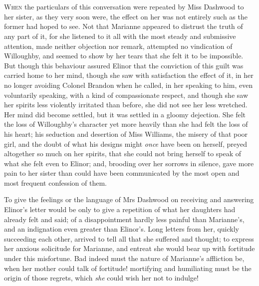 \chapter[Chapter \thechapter]{}
\lettrine[lraise=0.3]{W}{hen} the particulars of this conversation were repeated by Miss Dashwood to her sister, as they very soon were, the effect on her was not entirely such as the former had hoped to see. Not that Marianne appeared to distrust the truth of any part of it, for she listened to it all with the most steady and submissive attention, made neither objection nor remark, attempted no vindication of Willoughby, and seemed to show by her tears that she felt it to be impossible. But though this behaviour assured Elinor that the conviction of this guilt was carried home to her mind, though she saw with satisfaction the effect of it, in her no longer avoiding Colonel Brandon when he called, in her speaking to him, even voluntarily speaking, with a kind of compassionate respect, and though she saw her spirits less violently irritated than before, she did not see her less wretched. Her mind did become settled, but it was settled in a gloomy dejection. She felt the loss of Willoughby's character yet more heavily than she had felt the loss of his heart; his seduction and desertion of Miss Williams, the misery of that poor girl, and the doubt of what his designs might \textit{once} have been on herself, preyed altogether so much on her spirits, that she could not bring herself to speak of what she felt even to Elinor; and, brooding over her sorrows in silence, gave more pain to her sister than could have been communicated by the most open and most frequent confession of them.

To give the feelings or the language of Mrs Dashwood on receiving and answering Elinor's letter would be only to give a repetition of what her daughters had already felt and said; of a disappointment hardly less painful than Marianne's, and an indignation even greater than Elinor's. Long letters from her, quickly succeeding each other, arrived to tell all that she suffered and thought; to express her anxious solicitude for Marianne, and entreat she would bear up with fortitude under this misfortune. Bad indeed must the nature of Marianne's affliction be, when her mother could talk of fortitude! mortifying and humiliating must be the origin of those regrets, which \textit{she} could wish her not to indulge!

